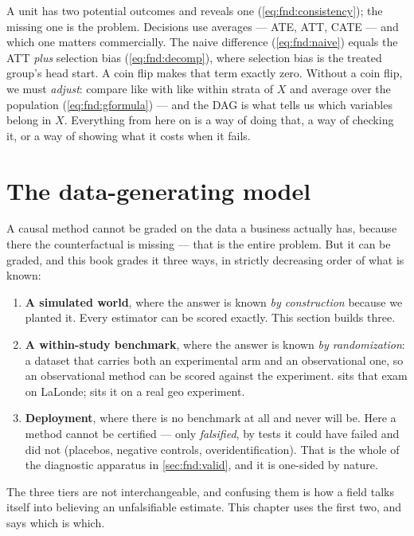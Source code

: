 \begin{recap}
A unit has two potential outcomes and reveals one (\cref{eq:fnd:consistency}); the missing one
is the problem. Decisions use averages --- ATE, ATT, CATE --- and which one matters
commercially. The naive difference (\cref{eq:fnd:naive}) equals the ATT \emph{plus} selection
bias (\cref{eq:fnd:decomp}), where selection bias is the treated group's head start. A coin
flip makes that term exactly zero. Without a coin flip, we must \emph{adjust}: compare like
with like within strata of $X$ and average over the population
(\cref{eq:fnd:gformula}) --- and the DAG is what tells us which variables belong in $X$.
Everything from here on is a way of doing that, a way of checking it, or a way of showing
what it costs when it fails.
\end{recap}

\section{The data-generating model}
\label{sec:fnd:dgm}

A causal method cannot be graded on the data a business actually has, because there the
counterfactual is missing --- that is the entire problem. But it can be graded, and this book
grades it three ways, in strictly decreasing order of what is known:
%
\begin{enumerate}[leftmargin=*, itemsep=.2em]
  \item \textbf{A simulated world}, where the answer is known \emph{by construction} because we
        planted it. Every estimator can be scored exactly. This section builds three.
  \item \textbf{A within-study benchmark}, where the answer is known \emph{by randomization}:
        a dataset that carries both an experimental arm and an observational one, so an
        observational method can be scored against the experiment.  sits that
        exam on LaLonde;  sits it on a real geo experiment.
  \item \textbf{Deployment}, where there is no benchmark at all and never will be. Here a method
        cannot be certified --- only \emph{falsified}, by tests it could have failed and did not
        (placebos, negative controls, overidentification). That is the whole of the diagnostic
        apparatus in \cref{sec:fnd:valid}, and it is one-sided by nature.
\end{enumerate}
%
The three tiers are not interchangeable, and confusing them is how a field talks itself into
believing an unfalsifiable estimate. This chapter uses the first two, and says which is which.


